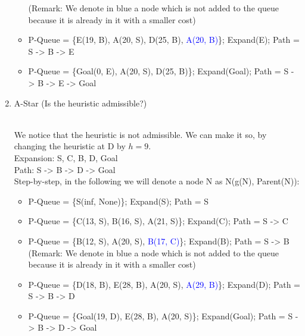 \documentclass[9pt,a4paper]{extarticle}
\newenvironment{solution}
    {%
    \color{red}
    }
    { 
    \color{black}
    }
\newcommand{\blue}[1]{\textcolor{blue}{#1}}
\begin{document}
\begin{enumerate}
\begin{solution}
\begin{itemize}
            (Remark: We denote in blue a node which is not added to the queue because it is already in it with a smaller cost)
            \item P-Queue = \{E(19, B), A(20, S), D(25, B), \blue{A(20, B)}\}; Expand(E); Path = S -> B -> E
            \item P-Queue = \{Goal(0, E), A(20, S), D(25, B)\}; Expand(Goal); Path = S -> B -> E -> Goal
        \end{itemize}
        \end{solution}
        \item A-Star (Is the heuristic admissible?)
        \begin{solution}
        \\
        We notice that the heuristic is not admissible. We can make it so, by changing the heuristic at D by $h=9$.
        \\
        Expansion: S, C, B, D, Goal\\
        Path: S -> B -> D -> Goal\\
        Step-by-step, in the following we will denote a node N as N(g(N), Parent(N)):
        \begin{itemize}
            \item P-Queue = \{S(inf, None)\}; Expand(S); Path = S
            \item P-Queue = \{C(13, S), B(16, S), A(21, S)\}; Expand(C); Path = S -> C
            \item P-Queue = \{B(12, S), A(20, S), \blue{B(17, C)}\}; Expand(B); Path = S -> B
            (Remark: We denote in blue a node which is not added to the queue because it is already in it with a smaller cost)
            \item P-Queue = \{D(18, B), E(28, B), A(20, S), \blue{A(29, B)}\}; Expand(D); Path = S -> B -> D
            \item P-Queue = \{Goal(19, D), E(28, B), A(20, S)\}; Expand(Goal); Path = S -> B -> D -> Goal
        \end{itemize}
        \end{solution}
    \end{enumerate}
\end{document}
